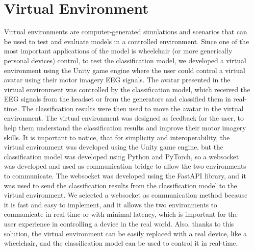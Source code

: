 \section{Virtual Environment}
Virtual environments are computer-generated simulations and scenarios that can be used to test and evaluate models in a controlled environment.
Since one of the most important applications of the model is wheelchair (or more generically personal devices) control, to test the classification model, we developed a virtual environment using the Unity game engine where the user could control a virtual avatar using their motor imagery EEG signals.
The avatar presented in the virtual environment was controlled by the classification model, which received the EEG signals from the headset or from the generators and classified them in real-time.
The classification results were then used to move the avatar in the virtual environment.
The virtual environment was designed as feedback for the user, to help them understand the classification results and improve their motor imagery skills.
It is important to notice, that for simplicity and interoperability, the virtual environment was developed using the Unity game engine, but the classification model was developed using Python and PyTorch, so a websocket was developed and used as communication bridge to allow the two environments to communicate.
The websocket was developed using the FastAPI library, and it was used to send the classification results from the classification model to the virtual environment.
We selected a websocket as communication method because it is fast and easy to implement, and it allows the two environments to communicate in real-time or with minimal latency, which is important for the user experience in controlling a device in the real world.
Also, thanks to this solution, the virtual environment can be easily replaced with a real device, like a wheelchair, and the classification model can be used to control it in real-time.

